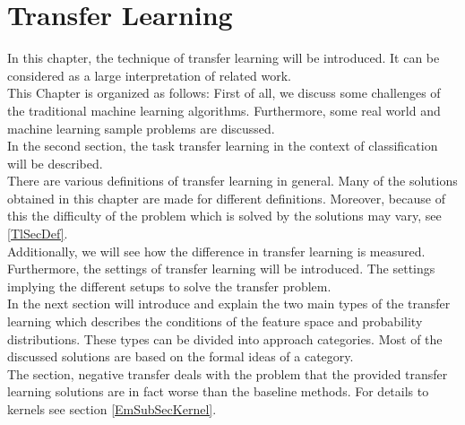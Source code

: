 \chapter{Transfer Learning}\label{Tl}
In this chapter, the technique of transfer learning will be introduced.
It can be considered as a large interpretation of related work.\\
This Chapter is organized as follows:    
First of all, we discuss some challenges of the traditional machine learning algorithms.
Furthermore, some real world and machine learning sample problems are discussed.\\
In the second section, the task transfer learning in the context of classification will be described.\\
There are various definitions of transfer learning in general.
Many of the solutions obtained in this chapter are made for different definitions.
Moreover, because of this the difficulty of the problem which is solved by the solutions may vary, see \ref{TlSecDef}.\\
Additionally, we will see how the difference in transfer learning is measured.\\
Furthermore, the settings of transfer learning will be introduced.
The settings implying the different setups to solve the transfer problem.\\
In the next section will introduce and explain the two main types of the transfer learning which describes the conditions of the feature space and probability distributions.
These types can be divided into approach categories.
Most of the discussed solutions are based on the formal ideas of a category.\\
The section, negative transfer deals with the problem that the provided transfer learning solutions are in fact worse than the baseline methods.
For details to kernels see section \ref{EmSubSecKernel}.

